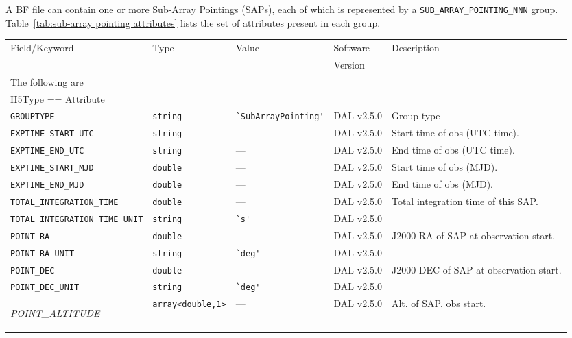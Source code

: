 \documentclass[a4paper,10pt,bibtotoc]{scrartcl}
\begin{document}
A BF file can contain one or more Sub-Array Pointings (SAPs), each of which is represented by a {\tt SUB\_ARRAY\_POINTING\_NNN} group. Table~\ref{tab:sub-array pointing attributes} lists the set of attributes present in each group.

\begin{small}
\begin{table}[p]
\begin{small}
  \centering
  \begin{tabular}{|llllp{5.0cm}|}
    \hline
    \sc Field/Keyword  & \sc Type & \sc Value & \sc Software  & Description \\
    \sc   & \sc & \sc & \sc Version  & \\
    \hline \hline
    \sc The following are & \sc & \sc & \sc   &\\
    \sc H5Type == Attribute & \sc & \sc & \sc   &\\
    \hline 
    \verb|GROUPTYPE|   & \verb|string| & \verb|`SubArrayPointing'| & DAL v2.5.0 & Group type  \\
    \verb|EXPTIME_START_UTC|  & \verb|string| & --- & DAL v2.5.0 & Start time of obs (UTC time). \\
    \verb|EXPTIME_END_UTC|  & \verb|string| & --- & DAL v2.5.0 & End time of obs (UTC time). \\
    \verb|EXPTIME_START_MJD|  & \verb|double| & --- & DAL v2.5.0 & Start time of obs (MJD). \\
    \verb|EXPTIME_END_MJD|  & \verb|double|  & --- & DAL v2.5.0 & End time of obs (MJD). \\
    \verb|TOTAL_INTEGRATION_TIME| & \verb|double| & --- & DAL v2.5.0 & Total integration time of this SAP. \\
    \verb|TOTAL_INTEGRATION_TIME_UNIT| & \verb|string| & \verb|`s'| & DAL v2.5.0 & \\
    \verb|POINT_RA|  & \verb|double| & --- & DAL v2.5.0 & J2000 RA of SAP at observation start. \\
    \verb|POINT_RA_UNIT|  & \verb|string| & \verb|`deg'| & DAL v2.5.0 & \\
    \verb|POINT_DEC|  & \verb|double| & --- & DAL v2.5.0 & J2000 DEC of SAP at observation start. \\
    \verb|POINT_DEC_UNIT|  & \verb|string| & \verb|`deg'| & DAL v2.5.0 & \\
    \begin{scriptsize}\textit{POINT\_ALTITUDE}\end{scriptsize} & \verb|array<double,1>| & --- & DAL v2.5.0  &Alt. of SAP, obs start.\\

\end{tabular}
\end{small}
\end{table}
\end{small}
\end{document}
